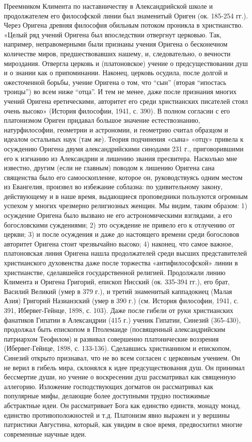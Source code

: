 Преемником Климента по наставничеству в Александрийской школе и
продолжателем его философской линии был знаменитый Ориген (ок. 185-254
гг.). Через Оригена древняя философия обильным потоком проникла в
христианство. «Целый ряд учений Оригена был впоследствии отвергнут
церковью. Так, например, неправомерными были признаны учения Оригена о
бесконечном количестве миров, предшествовавших нашему, и,
следовательно, о вечности мироздания. Отвергла церковь и
(платоновское) учение о предсуществовании душ и о знании как о
припоминании. Наконец, церковь осудила, после долгой и ожесточенной
борьбы, учение Оригена о том, что ``сын'' (вторая ``ипостась троицы'')
во всем ниже ``отца''. И тем не менее, даже после признания многих
учений Оригена еретическими, авторитет его среди христианских
писателей стоял очень высоко» (История философии, 1941, с. 390). В
полном согласии с его платонизмом Ориген придавал большое значение
естествознанию, натурфилософии, геометрии и астрономии, и геометрию
считал образцом и идеалом остальных наук (там же). Теория подчинения
«сына» «отцу» привела к осуждению Оригена двумя александрийскими
синодами 231 г., приговорившими его к изгнанию из Александрии и
лишению звания пресвитера. Насколько мне известно, другим (если не
главным) поводом к лишению Оригена сана священства было его
самооскопление, которое он, руководствуясь одним местом из Евангелия,
произвел во избежание соблазна: по удивительному закону, действующему
и в наше время, выдающиеся проповедники пользуются огромным успехом у
многих чрезмерно религиозных женщин. Мы видим, таким образом: 1)
осуждение Оригена было вызвано не его астрономическими взглядами, а
его богословскими суждениями; 2) это осуждение не привело его к
отлучению от церкви; 3) и после осуждения и даже до настоящего времени
среди богословов авторитет Оригена стоит чрезвычайно высоко; 4)
наконец, что самое важное, платоновская линия Оригена нашла
продолжателей среди высших представителей христианского духовенства
даже после торжества «антифилософской» линии в христианстве,
сделавшейся государственной религией. Продолжали линию Климента и
Оригена Григорий, епископ Нисский (ок. 335-394 гг.), его брат, Василий
Великий (умер в 379 г.), и третий знаменитый каппадокиец (Малая Азия)
Григорий Назианзский (умер в 390 г.) (см. История философии, 1941, с.
391, Ибервег-Гейнце, 1898, с. 103). Даже после гибели от руки
христианских фанатиков Гипатии в Александрии (415 г.) ученик Гипатии,
Синезий (365-430), продолжал быть епископом в Птолемаиде (посвященный
александрийским патриархом Теофилом) и развивал совершенно
платонические воззрения (Ибервег-Гейнце, 1898, с. 133-136). Сделавшись
христианином и епископом, Синезий открыто признавал, что не во всем
согласен с церковным учением. Он не верил в гибель мира, склонялся к
идее предсуществования душ. Он принимал бессмертие души, но учение о
воскресении душ рассматривал как священную аллегорию. Изложение
господствующих догматов он рассматривал как популярные мифы, делающие
более доступными трудно постижимые абстрактные идеи. Он рассматривает
Бога как единство единств, монаду монад, единство противоположностей и
т.д. Платонизм явно выражен и у вершины патристики Августина,
который, как увидим в свое время, предвосхитил многие современные
научные идеи.

